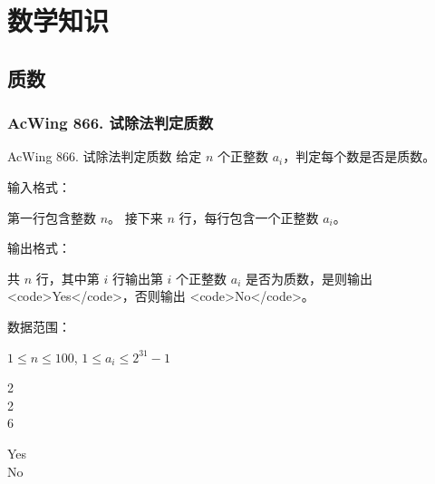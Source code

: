 \chapter{数学知识}


\section{质数}

\subsection{AcWing 866. 试除法判定质数}
\begin{titledbox}{AcWing 866. 试除法判定质数}
    给定 $n$ 个正整数 $a_i$，判定每个数是否是质数。

    输入格式：

    第一行包含整数 $n$。 接下来 $n$ 行，每行包含一个正整数 $a_i$。

    输出格式：

    共 $n$ 行，其中第 $i$ 行输出第 $i$ 个正整数 $a_i$ 是否为质数，是则输出 <code>Yes</code>，否则输出 <code>No</code>。

    数据范围：

    $1 \le n \le 100$, $1 \le a_i \le 2^{31}-1$

    \begin{inputblock}
        2 \\
        2 \\
        6
    \end{inputblock}
    \begin{outputblock}
        Yes \\
        No
    \end{outputblock}
\end{titledbox}

